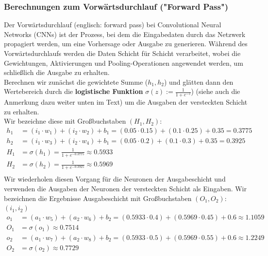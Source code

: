 \documentclass[12pt]{article}
\begin{document}
\subsubsection{Berechnungen zum Vorwärtsdurchlauf ("Forward Pass")}
Der Vorwärtsdurchlauf (englisch: forward pass) bei Convolutional Neural Networks (CNNs) ist der Prozess, bei dem die Eingabedaten durch das Netzwerk propagiert werden, um eine Vorhersage oder Ausgabe zu generieren. Während des Vorwärtsdurchlaufs werden die Daten Schicht für Schicht verarbeitet, wobei die Gewichtungen, Aktivierungen und Pooling-Operationen angewendet werden, um schließlich die Ausgabe zu erhalten.\\
Berechnen wir zunächst die gewichtete Summe ($h_1, h_2$) und glätten dann den  Wertebereich durch die \textbf{logistische Funktion} $\sigma(z) := \frac{1}{1 + e^{-z}}$) (siehe auch die Anmerkung dazu weiter unten im Text) um die Ausgaben der versteckten Schicht zu erhalten.\\ Wir bezeichne diese mit Großbuchstaben $(H_1,H_2)$:
\\ 
\[
\begin{aligned}
h_1 &= (i_1 \cdot w_1) + (i_2 \cdot w_2) + b_1 = (0.05 \cdot 0.15) + (0.1 \cdot 0.25) + 0.35 = 0.3775 \\
h_2 &= (i_1 \cdot w_3) + (i_2 \cdot w_4) + b_1 = (0.05 \cdot 0.2) + (0.1 \cdot 0.3) + 0.35 = 0.3925\\
H_1 &= \sigma(h_1) = \frac{1}{1 + e^{-0.3775}} \approx 0.5933 \\
H_2 &= \sigma(h_2) = \frac{1}{1 + e^{-0.3925}} \approx 0.5969 \\
\end{aligned}\]
Wir wiederholen diesen Vorgang für die Neuronen der Ausgabeschicht und verwenden die Ausgaben der Neuronen der versteckten Schicht als Eingaben. Wir bezeichnen die Ergebnisse Ausgabeschicht mit Großbuchstaben $(O_1,O_2)$:$(i_1,i_2)$\\
\[
\begin{aligned}
o_1 &= (a_1 \cdot w_5) + (a_2 \cdot w_6) + b_2 = (0.5933 \cdot 0.4) + (0.5969 \cdot 0.45) + 0.6 \approx 1.1059 \\
O_1 &= \sigma(o_1) \approx 0.7514\\
o_2 &= (a_1 \cdot w_7) + (a_2 \cdot w_8) + b_2 = (0.5933 \cdot 0.5) + (0.5969 \cdot 0.55) + 0.6 \approx 1.2249 \\
O_2 &= \sigma(o_2) \approx 0.7729\\
\end{aligned}
\]
\\
\end{document}
